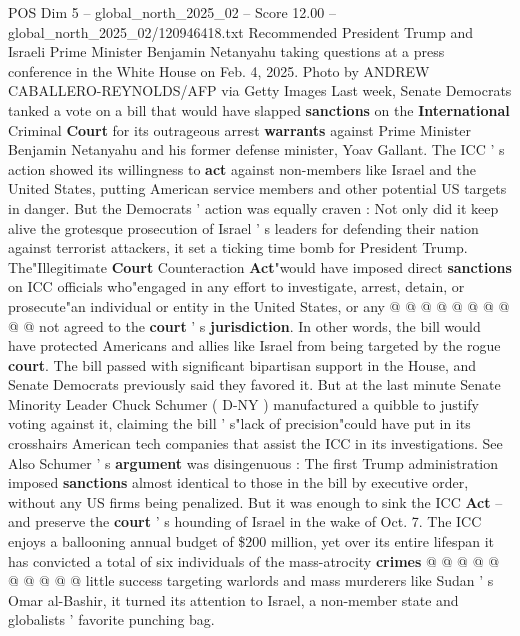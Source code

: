 \begin{textsample}{POS Dim 5 – global\_north\_2025\_02 – Score 12.00 – global\_north\_2025\_02/120946418.txt}  \label{ex:f5_pos_338}
Recommended President Trump and Israeli Prime Minister Benjamin Netanyahu taking questions at a press conference in the White House on Feb. 4, 2025.
Photo by ANDREW CABALLERO-REYNOLDS/AFP via Getty Images Last week, Senate Democrats tanked a vote on a bill that would have slapped \textbf{sanctions} on the \textbf{International} Criminal \textbf{Court} for its outrageous arrest \textbf{warrants} against Prime Minister Benjamin Netanyahu and his former defense minister, Yoav Gallant.
The ICC ' s action showed its willingness to \textbf{act} against non-members like Israel and the United States, putting American service members and other potential US targets in danger.
But the Democrats ' action was equally craven : Not only did it keep alive the grotesque prosecution of Israel ' s leaders for defending their nation against terrorist attackers, it set a ticking time bomb for President Trump.
The"Illegitimate \textbf{Court} Counteraction \textbf{Act}"would have imposed direct \textbf{sanctions} on ICC officials who"engaged in any effort to investigate, arrest, detain, or prosecute"an individual or entity in the United States, or any @ @ @ @ @ @ @ @ @ @ not agreed to the \textbf{court} ' s \textbf{jurisdiction}.
In other words, the bill would have protected Americans and allies like Israel from being targeted by the rogue \textbf{court}.
The bill passed with significant bipartisan support in the House, and Senate Democrats previously said they favored it.
But at the last minute Senate Minority Leader Chuck Schumer ( D-NY ) manufactured a quibble to justify voting against it, claiming the bill ' s"lack of precision"could have put in its crosshairs American tech companies that assist the ICC in its investigations.
See Also Schumer ' s \textbf{argument} was disingenuous : The first Trump administration imposed \textbf{sanctions} almost identical to those in the bill by executive order, without any US firms being penalized.
But it was enough to sink the ICC \textbf{Act} -- and preserve the \textbf{court} ' s hounding of Israel in the wake of Oct. 7.
The ICC enjoys a ballooning annual budget of \$200 million, yet over its entire lifespan it has convicted a total of six individuals of the mass-atrocity \textbf{crimes} @ @ @ @ @ @ @ @ @ @ little success targeting warlords and mass murderers like Sudan ' s Omar al-Bashir, it turned its attention to Israel, a non-member state and globalists ' favorite punching bag.

\end{textsample}
